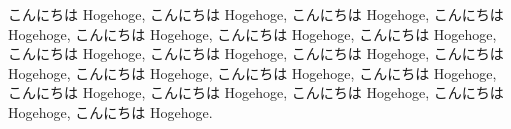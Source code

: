 こんにちは Hogehoge, こんにちは Hogehoge, こんにちは Hogehoge, こんにちは Hogehoge, こんにちは Hogehoge, こんにちは Hogehoge, こんにちは Hogehoge, こんにちは Hogehoge, こんにちは Hogehoge, こんにちは Hogehoge, こんにちは Hogehoge, こんにちは Hogehoge, こんにちは Hogehoge, こんにちは Hogehoge, こんにちは Hogehoge, こんにちは Hogehoge, こんにちは Hogehoge, こんにちは Hogehoge, こんにちは Hogehoge.